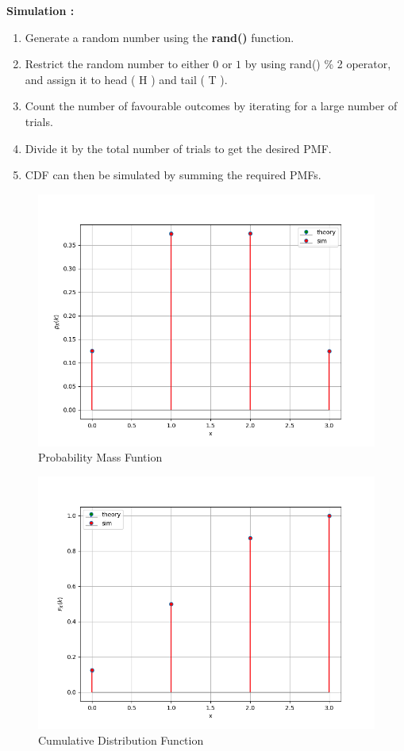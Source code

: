 \documentclass[journal]{IEEEtran}
\begin{document}
\textbf{Simulation : } \\
\begin{enumerate}
	\item Generate a random number using the \textbf{rand()} function. 
	\item Restrict the random number to either $0$ or $1$ by using rand() \% 2 operator, and assign it to head ( H ) and tail ( T ).
	\item Count the number of favourable outcomes by iterating for a large number of trials.
	\item Divide it by the total number of trials to get the desired PMF.
	\item CDF can then be simulated by summing the required PMFs.
\end{enumerate}
\begin{figure}[h]
\centering
\includegraphics[width=\columnwidth]{figs/pmf.png}
\caption{Probability Mass Funtion}
\label{fig:Plot1} 
\end{figure}

\begin{figure}[h]
\centering
\includegraphics[width=\columnwidth]{figs/cdf.png}
\caption{Cumulative Distribution Function}
\label{fig:Plot1} 
\end{figure}
\end{document}
